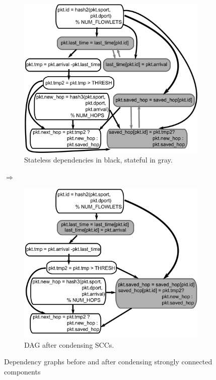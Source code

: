 \begin{figure}[!t]
\begin{subfigure}{0.5\columnwidth}
  \includegraphics[width=0.98\columnwidth]{domino_deps.pdf}
  \caption{Stateless dependencies in black, stateful in gray.}
  \label{fig:partitioning_before}
\end{subfigure}
\textbf{$\Longrightarrow$ }
\begin{subfigure}{0.5\columnwidth}
\includegraphics[width=0.98\columnwidth]{domino_scc.pdf}
\caption{DAG after condensing SCCs.}
\label{fig:partitioning_after}
\end{subfigure}
\caption{Dependency graphs before and after condensing strongly connected components}
\label{fig:pipelining}
\end{figure}

